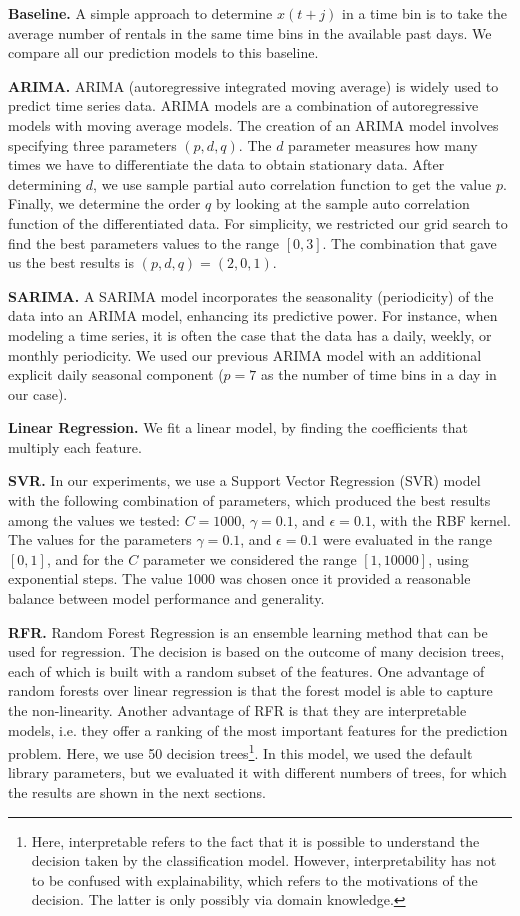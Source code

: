 \textbf{Baseline.} A simple approach to determine $x(t+j)$ in a time bin is to take the average number of rentals in the same time bins in the available past days. 
We compare all our prediction models to this baseline. 

\textbf{ARIMA.} ARIMA (autoregressive integrated moving average) is widely used to predict time series data.  ARIMA models are a combination of autoregressive models with moving average models. The creation of an ARIMA model involves specifying three parameters $(p, d, q)$. The $d$ parameter measures how many times we have to differentiate the data to obtain stationary data. After determining $d$, we use sample partial auto correlation function to get the value $p$. Finally, we determine the order $q$ by looking at the sample auto correlation function of the differentiated data. 
For simplicity, we restricted our grid search to find the best parameters values to the range $[0, 3]$. The combination that gave us the best results is $(p, d, q) = (2, 0, 1)$.


\textbf{SARIMA.} A SARIMA model incorporates the seasonality (periodicity) of the data into an ARIMA model, enhancing its predictive power. For instance, when modeling a time series, it is often the case that the data has a daily, weekly, or monthly periodicity. We used our previous ARIMA model with an additional explicit daily seasonal component ($p=7$ as the number of time bins in a day in our case). 

\textbf{Linear Regression.} We fit a linear model, by finding the coefficients that multiply each feature. 

\textbf{SVR.}  In our experiments, we use a Support Vector Regression (SVR) model with the following combination of parameters, which produced the best results among the values we tested: $C = 1000$, $\gamma = 0.1$, and $\epsilon = 0.1$, with the RBF kernel. 
The values for the parameters $\gamma = 0.1$, and $\epsilon = 0.1$ were evaluated in the range $[0, 1]$, and for the $C$ parameter we considered the range $[1, 10000]$, using exponential steps. The value 1000 was chosen once it provided a reasonable balance between model performance and generality.

\textbf{RFR.} Random Forest Regression is an ensemble learning method that can be used  for regression. The decision is based on the outcome of many decision trees, each of which is built with a random subset of the features. One advantage of random forests over linear regression is that the forest model is able to capture the non-linearity. Another advantage of RFR is that they are interpretable models, i.e. they offer a ranking of the most important features for the prediction problem. Here, we use 50 decision trees\footnote{Here, interpretable refers to the fact that it is possible to understand the decision taken by the classification model. However, interpretability has not to be confused with explainability, which refers to the motivations of the decision. The latter is only possibly via domain knowledge.}. 
In this model, we used the default library parameters, but we evaluated it with different numbers of trees, for which the results are shown in the next sections.

